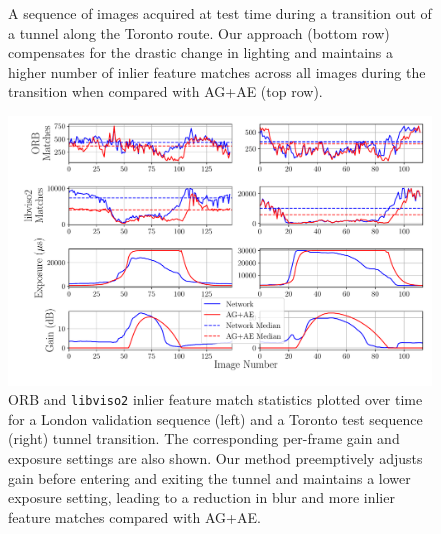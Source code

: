 \documentclass[letterpaper, 10pt, journal, twoside]{IEEEtran}
\begin{document}
\begin{figure}[thpb]
	\setlength{\fboxsep}{0pt}%
	\setlength{\fboxrule}{1pt}%
	\centering
	\caption{A sequence of images acquired at test time during a transition out of a tunnel along the Toronto route. Our approach (bottom row) compensates for the drastic change in lighting and maintains a higher number of inlier feature matches across all images during the transition when compared with AG+AE (top row).}
	\vspace{-4mm}
	\label{fig:network_sequence}
\end{figure}

\begin{figure}[b!]
	\vspace{-4mm}
	\centering
	\includegraphics[trim=24pt 18pt 0pt 0,clip,width=\columnwidth]{double_experiment_plot.pdf}
	\caption{ORB and \texttt{libviso2} inlier feature match statistics plotted over time for a London validation sequence (left) and a Toronto test sequence (right) tunnel transition. The corresponding per-frame gain and exposure settings are also shown. Our method preemptively adjusts gain before entering and exiting the tunnel and maintains a lower exposure setting, leading to a reduction in blur and more inlier feature matches compared with AG+AE.}
	\label{fig:matchplot}
\end{figure}
\end{document}
